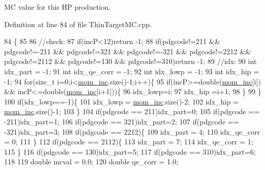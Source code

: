 M\-C value for this H\-P production. 



Definition at line 84 of file Thin\-Target\-M\-C.\-cpp.


\begin{DoxyCode}
84                                                                                  \{
85 
86     \textcolor{comment}{//check:}
87     \textcolor{keywordflow}{if}(incP<12)\textcolor{keywordflow}{return} -1;    
88     \textcolor{keywordflow}{if}(pdgcode!=211 && pdgcode!=-211 && pdgcode!=321 && pdgcode!=-321 && pdgcode!=2212 && pdgcode!=2112 && 
      pdgcode!=130 && pdgcode!=310)\textcolor{keywordflow}{return} -1;    
89     \textcolor{comment}{//idx:}
90     \textcolor{keywordtype}{int} idx\_part = -1;
91     \textcolor{keywordtype}{int} idx\_qe\_corr = -1;
92     \textcolor{keywordtype}{int} idx\_lowp = -1;
93     \textcolor{keywordtype}{int} idx\_hip  = -1;
94     \textcolor{keywordflow}{for}(\textcolor{keywordtype}{size\_t} i=0;i<\hyperlink{class_neutrino_flux_reweight_1_1_thin_target_m_c_a039f1c0831ba09714b7ac1c9eca47a22}{mom\_inc}.size()-1;i++)\{
95       \textcolor{keywordflow}{if}(incP>=\textcolor{keywordtype}{double}(\hyperlink{class_neutrino_flux_reweight_1_1_thin_target_m_c_a039f1c0831ba09714b7ac1c9eca47a22}{mom\_inc}[i]) && incP<=double(\hyperlink{class_neutrino_flux_reweight_1_1_thin_target_m_c_a039f1c0831ba09714b7ac1c9eca47a22}{mom\_inc}[i+1]))\{
96         idx\_lowp=i;
97         idx\_hip =i+1;
98       \}
99     \}
100     \textcolor{keywordflow}{if}(idx\_lowp==-1)\{
101       idx\_lowp = \hyperlink{class_neutrino_flux_reweight_1_1_thin_target_m_c_a039f1c0831ba09714b7ac1c9eca47a22}{mom\_inc}.size()-2;
102       idx\_hip  = \hyperlink{class_neutrino_flux_reweight_1_1_thin_target_m_c_a039f1c0831ba09714b7ac1c9eca47a22}{mom\_inc}.size()-1;
103     \}
104     \textcolor{keywordflow}{if}(pdgcode ==  211)idx\_part=0;
105     \textcolor{keywordflow}{if}(pdgcode == -211)idx\_part=1;
106     \textcolor{keywordflow}{if}(pdgcode ==  321)idx\_part=2;
107     \textcolor{keywordflow}{if}(pdgcode == -321)idx\_part=3;
108     \textcolor{keywordflow}{if}(pdgcode == 2212)\{
109       idx\_part    = 4;
110       idx\_qe\_corr = 0;
111     \}
112     \textcolor{keywordflow}{if}(pdgcode == 2112)\{
113        idx\_part    = 7;
114        idx\_qe\_corr = 1;
115     \}
116     \textcolor{keywordflow}{if}(pdgcode ==  130)idx\_part=5;
117     \textcolor{keywordflow}{if}(pdgcode ==  310)idx\_part=6;
118     
119     \textcolor{keywordtype}{double} mcval    = 0.0;
120     \textcolor{keywordtype}{double} qe\_corr = 1.0;

\end{DoxyCode}
